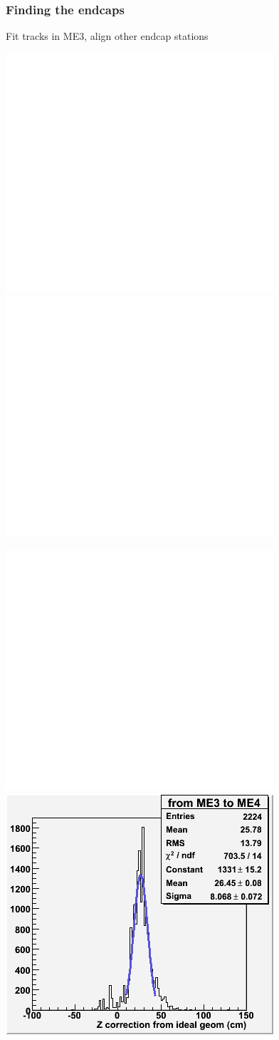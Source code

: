 \documentclass[compress]{beamer}
\begin{document}
\begin{frame}
\frametitle{Finding the endcaps}

Fit tracks in ME3, align other endcap stations

\includegraphics[width=0.4\linewidth]{blank.png}
\includegraphics[width=0.4\linewidth]{blank.png}

\includegraphics[width=0.4\linewidth]{blank.png}
\includegraphics[width=0.4\linewidth]{hist_3and4.png}

\end{frame}
\end{document}
